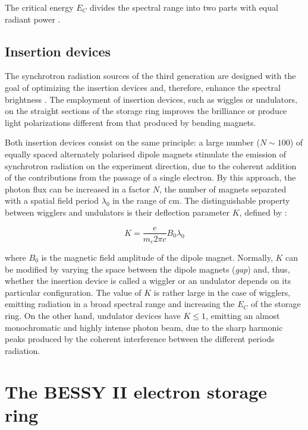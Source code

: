 The critical energy $E_C$ divides the spectral range into two parts with equal radiant power \citep{baumgartel_e.-e._1984}.

\subsection{Insertion devices}

The synchrotron radiation sources of the third generation are designed with the goal of optimizing the insertion devices and, therefore, enhance the spectral brightness \citep{ries_nonlinear_2014}. The employment of insertion devices, such as wiggles or undulators, on the straight sections of the storage ring improves the brilliance or produce light polarizations different from that produced by bending magnets.

Both insertion devices consist on the same principle: a large number ($N\sim100$) of equally spaced alternately polarised dipole magnets stimulate the emission of synchrotron radiation on the experiment direction, due to the coherent addition of the contributions from the passage of a single electron. By this approach, the photon flux can be increased  in a factor $N$, the number of magnets separated with a spatial field period $\lambda_0$ in the range of cm. The distinguishable property between wigglers and undulators is their deflection parameter $K$, defined by \citep{baumgartel_e.-e._1984}:

\begin{equation}
        K=\frac{e}{m_e 2\pi c}B_0\lambda_0
\end{equation}

where $B_0$ is the magnetic field amplitude of the dipole magnet. Normally, $K$ can be modified by varying the space between the dipole magnets (\emph{gap}) and, thus, whether the insertion device is  called a wiggler or an undulator depends on its particular configuration. The value of $K$ is rather large in the case of wigglers, emitting radiation in a broad spectral range and increasing the $E_C$ of the storage ring. On the other hand, undulator devices have $K\leq1$, emitting an almost monochromatic and highly intense photon beam, due to the sharp harmonic peaks produced by the coherent interference between the different periods radiation.

\section{The BESSY II electron storage ring}

